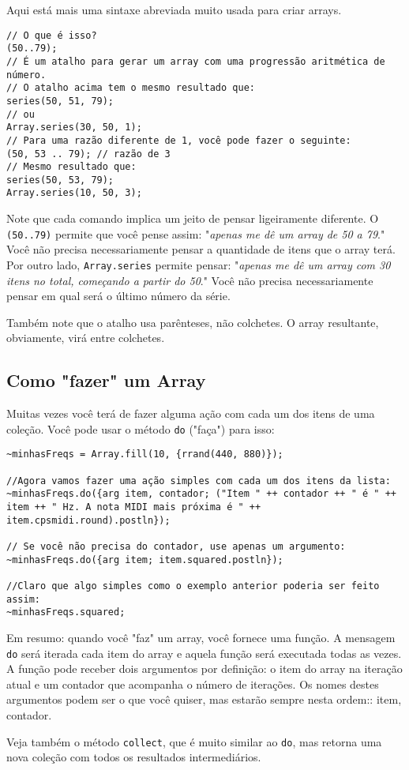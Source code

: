 Aqui está mais uma sintaxe abreviada muito usada para criar arrays.

 
\begin{lstlisting}[style=SuperCollider-IDE, basicstyle=\scttfamily\footnotesize]
// O que é isso?
(50..79);
// É um atalho para gerar um array com uma progressão aritmética de número.
// O atalho acima tem o mesmo resultado que:
series(50, 51, 79);
// ou
Array.series(30, 50, 1);
// Para uma razão diferente de 1, você pode fazer o seguinte:
(50, 53 .. 79); // razão de 3
// Mesmo resultado que:
series(50, 53, 79);
Array.series(10, 50, 3);
\end{lstlisting}

Note que cada comando implica um jeito de pensar ligeiramente diferente. O \texttt{(50..79)} permite que você pense assim: "\emph{apenas me dê um array de 50 a 79}." Você não precisa necessariamente pensar a quantidade de itens que o array terá. Por outro lado, \texttt{Array.series} permite pensar: "\emph{apenas me dê um array com 30 itens no total, começando a partir do 50}." Você não precisa necessariamente pensar em qual será o último número da série.

Também note que o atalho usa parênteses, não colchetes. O array resultante, obviamente, virá entre colchetes.
\subsection{Como "fazer" um Array}

Muitas vezes você terá de fazer alguma ação com cada um dos itens de uma coleção. Você pode usar o método \texttt{do} ("faça") para isso:


\begin{lstlisting}[style=SuperCollider-IDE, basicstyle=\scttfamily\footnotesize]
~minhasFreqs = Array.fill(10, {rrand(440, 880)});

//Agora vamos fazer uma ação simples com cada um dos itens da lista:
~minhasFreqs.do({arg item, contador; ("Item " ++ contador ++ " é " ++ item ++ " Hz. A nota MIDI mais próxima é " ++ item.cpsmidi.round).postln});

// Se você não precisa do contador, use apenas um argumento:
~minhasFreqs.do({arg item; item.squared.postln});

//Claro que algo simples como o exemplo anterior poderia ser feito assim:
~minhasFreqs.squared;
\end{lstlisting}
 

Em resumo: quando você "faz" um array, você fornece uma função. A mensagem \texttt{do} será iterada cada item do array e aquela função será executada todas as vezes. A função pode receber dois argumentos por definição: o item do array na iteração atual e um contador que acompanha o número de iterações. Os nomes destes argumentos podem ser o que você quiser, mas estarão sempre nesta ordem:: item, contador.

Veja também o método \texttt{collect}, que é muito similar ao \texttt{do}, mas retorna uma nova coleção com todos os resultados intermediários.
